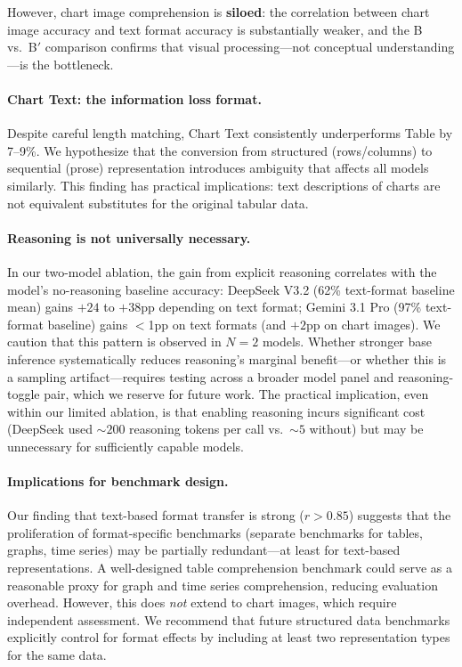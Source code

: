 \documentclass[11pt]{article}
\begin{document}
However, chart image comprehension is \textbf{siloed}: the correlation between chart image accuracy and text format accuracy is substantially weaker, and the B vs.\ B$'$ comparison confirms that visual processing---not conceptual understanding---is the bottleneck.

\paragraph{Chart Text: the information loss format.} Despite careful length matching, Chart Text consistently underperforms Table by 7--9\%. We hypothesize that the conversion from structured (rows/columns) to sequential (prose) representation introduces ambiguity that affects all models similarly. This finding has practical implications: text descriptions of charts are not equivalent substitutes for the original tabular data.

\paragraph{Reasoning is not universally necessary.} In our two-model ablation, the gain from explicit reasoning correlates with the model's no-reasoning baseline accuracy: DeepSeek V3.2 (62\% text-format baseline mean) gains $+24$ to $+38$pp depending on text format; Gemini 3.1 Pro (97\% text-format baseline) gains $<$1pp on text formats (and $+2$pp on chart images). We caution that this pattern is observed in $N{=}2$ models. Whether stronger base inference systematically reduces reasoning's marginal benefit---or whether this is a sampling artifact---requires testing across a broader model panel and reasoning-toggle pair, which we reserve for future work. The practical implication, even within our limited ablation, is that enabling reasoning incurs significant cost (DeepSeek used ${\sim}200$ reasoning tokens per call vs.\ ${\sim}5$ without) but may be unnecessary for sufficiently capable models.

\paragraph{Implications for benchmark design.} Our finding that text-based format transfer is strong ($r{>}0.85$) suggests that the proliferation of format-specific benchmarks (separate benchmarks for tables, graphs, time series) may be partially redundant---at least for text-based representations. A well-designed table comprehension benchmark could serve as a reasonable proxy for graph and time series comprehension, reducing evaluation overhead. However, this does \emph{not} extend to chart images, which require independent assessment. We recommend that future structured data benchmarks explicitly control for format effects by including at least two representation types for the same data.
\end{document}
